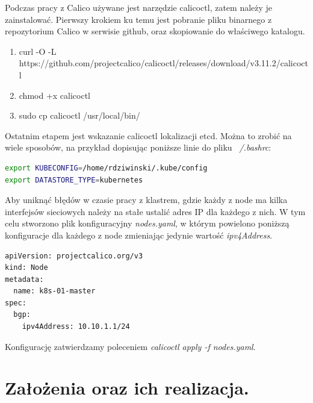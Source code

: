 \documentclass[pl,final,oneside]{mgr} %
\begin{document}
Podczas pracy z Calico używane jest narzędzie calicoctl, zatem należy je zainstalować. Pierwszy krokiem ku temu jest pobranie pliku binarnego z repozytorium Calico w serwisie github, oraz skopiowanie do właściwego katalogu.
\begin{enumerate}
	\item curl -O -L  https://github.com/projectcalico/calicoctl/releases/download/v3.11.2/calicoctl
	\item chmod +x calicoctl
	\item sudo cp calicoctl /usr/local/bin/
\end{enumerate}
Ostatnim etapem jest wskazanie calicoctl lokalizacji etcd. Można to zrobić na wiele sposobów, na przykład dopisując poniższe linie do pliku \textit{ ~/.bashrc}:
\begin{lstlisting}[language=Bash]
export KUBECONFIG=/home/rdziwinski/.kube/config
export DATASTORE_TYPE=kubernetes
\end{lstlisting}

Aby uniknąć błędów w czasie pracy z klastrem, gdzie każdy z node ma kilka interfejsów sieciowych należy na stałe ustalić adres IP dla każdego z nich. W tym celu stworzono plik konfiguracyjny \textit{nodes.yaml}, w którym powielono poniższą konfiguracje dla każdego z node zmieniając jedynie wartość \textit{ipv4Address}.
\begin{lstlisting}[language=Bash]
apiVersion: projectcalico.org/v3
kind: Node
metadata:
  name: k8s-01-master
spec:
  bgp:
    ipv4Address: 10.10.1.1/24
\end{lstlisting}
Konfigurację zatwierdzamy poleceniem \textit{calicoctl apply -f nodes.yaml}.



\chapter{Założenia oraz ich realizacja.}
\end{document}
